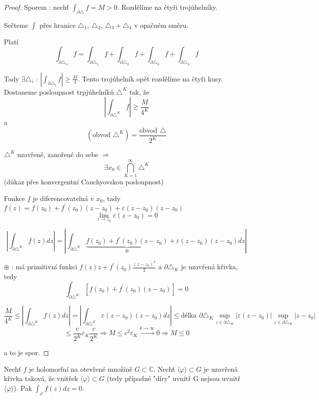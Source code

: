 \begin{proof}
Sporem : nechť $\int_{\partial \triangle} f = M > 0$. Rozdělíme na čtyři trojúhelníky.


Sečteme $\int$ přes hranice $\triangle_1$, $\triangle_2$, $\triangle_3 + \triangle_4$ v opačném směru.

Platí 
$$\int_{\partial \triangle_4} f = \int_{\partial \triangle_1} f + \int_{\partial \triangle_2} f + \int_{\partial \triangle_3} f + \int_{\partial \triangle_4} f$$

Tady $\exists \triangle_i \textrm{ : } \left| \int_{\partial \triangle_i} f \right| \geq \frac{M}{4}$. Tento trojúhelník opět rozdělíme na čtyři kusy. Dostaneme posloupnost trpjúhelníků $\triangle^K$ tak, že 
$$\left| \int_{\partial \triangle^K} f \right| \geq \frac{M}{4^K}$$
a
$$(\textrm{obvod $\triangle^K$}) = \frac{\textrm{obvod $\triangle$}}{2^K}$$

$\triangle^K$ uzavřené, zanořené do sebe $\Rightarrow$ 
$$\exists x_0 \in \bigcap_{K=1}^{\infty} \triangle^K$$
(důkaz přes konvergentní Cauchyovskou posloupnost)

Funkce $f$ je diferencovatelná v $x_0$, tady $f(z) = f(z_0) + f^\prime(z_0)(z-z_0) + \varepsilon (z-z_0)(z-z_0)$
$$\lim_{z \to z_0} \varepsilon (z-z_0) = 0$$

$$\left| \int_{\partial \triangle^K} f(z) dz \right| = \left| \int_{\partial \triangle^K} \underbrace{f(z_0) + f^\prime (z_0)(z-z_0)}_\circledast + \varepsilon (z-z_0) (z-z_0) dz \right|$$

$\circledast$ : má primitivní funkci $f(z)z + f^\prime(z_0) \frac{(z-z_0)^2}{2}$ a $\partial \triangle_K$ je uzavřená křivka, tedy 
$$\int_{\partial \triangle^K} \left[ f(z_0) + f^\prime (z_0) (z-z_0) \right] = 0$$

$$\frac{M}{4^K} \leq \left| \int_{\partial \triangle^K} f(z) dz \right| = \left| \int_{\partial \triangle^K} \varepsilon (z-z_0) (z-z_0) dz \right| \leq \textrm{délka } \partial \triangle_K \sup_{z \in \partial \triangle_K} \left| \varepsilon (z-z_0) \right| \sup_{z \in \partial \triangle_K} \left| z-z_0 \right| $$
$$ \leq \frac{c}{2^K} \varepsilon_K \frac{c}{2^K} \Rightarrow M \leq c^2 \varepsilon_K \overset{k \to \infty}{\rightarrow} 0 \Rightarrow M \leq 0$$

a to je spor.
\end{proof}

\begin{vetabd}[Cauchy]
Nechť $f$ je holomorfní na otevřené množině $G \subset \mathbb{C}$. Nechť $\langle \varphi \rangle \subset G$ je uzavřená křivka taková, že vnitřek $\langle \varphi \rangle \subset G$ (tedy případné "díry" uvnitř G nejsou uvnitř $\langle \varphi \rangle$). Pak $\int_\varphi f(z)dz=0$.
\end{vetabd}

